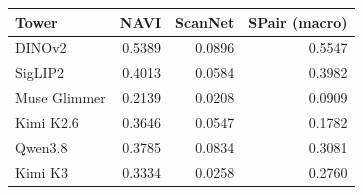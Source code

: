 \begin{tabular}{lrrr}
\toprule
Tower & NAVI & ScanNet & SPair (macro)\\
\midrule
DINOv2 & 0.5389 & 0.0896 & 0.5547\\
SigLIP2 & 0.4013 & 0.0584 & 0.3982\\
Muse Glimmer & 0.2139 & 0.0208 & 0.0909\\
Kimi K2.6 & 0.3646 & 0.0547 & 0.1782\\
Qwen3.8 & 0.3785 & 0.0834 & 0.3081\\
Kimi K3 & 0.3334 & 0.0258 & 0.2760\\
\bottomrule
\end{tabular}

